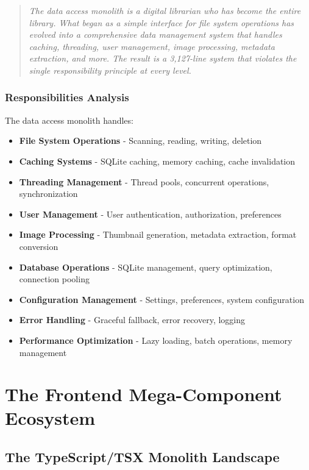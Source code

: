 \documentclass[11pt]{article}
\begin{document}
\begin{quote}
\emph{The data access monolith is a digital librarian who has become the entire library. What began as a simple interface for file system operations has evolved into a comprehensive data management system that handles caching, threading, user management, image processing, metadata extraction, and more. The result is a 3,127-line system that violates the single responsibility principle at every level.}
\end{quote}

\subsubsection{Responsibilities Analysis}

The data access monolith handles:

\begin{itemize}
\item \textbf{File System Operations} - Scanning, reading, writing, deletion
\item \textbf{Caching Systems} - SQLite caching, memory caching, cache invalidation
\item \textbf{Threading Management} - Thread pools, concurrent operations, synchronization
\item \textbf{User Management} - User authentication, authorization, preferences
\item \textbf{Image Processing} - Thumbnail generation, metadata extraction, format conversion
\item \textbf{Database Operations} - SQLite management, query optimization, connection pooling
\item \textbf{Configuration Management} - Settings, preferences, system configuration
\item \textbf{Error Handling} - Graceful fallback, error recovery, logging
\item \textbf{Performance Optimization} - Lazy loading, batch operations, memory management
\end{itemize}

\section{The Frontend Mega-Component Ecosystem}

\subsection{The TypeScript/TSX Monolith Landscape}
\end{document}
